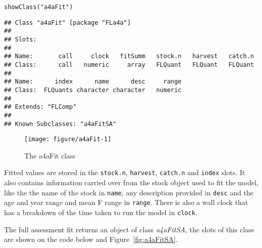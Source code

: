 \documentclass[a4paper,english,10pt]{article}\usepackage[]{graphicx}\usepackage[]{color}
\makeatletter
\def\maxwidth{ %
  \ifdim\Gin@nat@width>\linewidth
    \linewidth
  \else
    \Gin@nat@width
  \fi
}
\newcommand{\hlstr}[1]{\textcolor[rgb]{0.2,0.2,0.2}{#1}}%
\newcommand{\hlstd}[1]{\textcolor[rgb]{0,0,0}{#1}}%
\newcommand{\hlkwd}[1]{\textcolor[rgb]{0.361,0.506,0.596}{#1}}%
\newenvironment{kframe}{%
 \def\at@end@of@kframe{}%
 \ifinner\ifhmode%
  \def\at@end@of@kframe{\end{minipage}}%
  \begin{minipage}{\columnwidth}%
 \fi\fi%
 \def\FrameCommand##1{\hskip\@totalleftmargin \hskip-\fboxsep
 \colorbox{shadecolor}{##1}\hskip-\fboxsep
     \hskip-\linewidth \hskip-\@totalleftmargin \hskip\columnwidth}%
 \MakeFramed {\advance\hsize-\width
   \@totalleftmargin\z@ \linewidth\hsize
   \@setminipage}}%
 {\par\unskip\endMakeFramed%
 \at@end@of@kframe}
\newenvironment{knitrout}{}{} %
\newcommand{\code}[1]{{\texttt{#1}}}
\newcommand{\class}[1]{{\textit{#1}}}
\makeatother
\begin{document}
\begin{knitrout}
\color{fgcolor}\begin{kframe}
\begin{alltt}
\hlkwd{showClass}\hlstd{(}\hlstr{"a4aFit"}\hlstd{)}
\end{alltt}
\begin{verbatim}
## Class "a4aFit" [package "FLa4a"]
## 
## Slots:
##                                                                   
## Name:       call     clock   fitSumm   stock.n   harvest   catch.n
## Class:      call   numeric     array   FLQuant   FLQuant   FLQuant
##                                               
## Name:      index      name      desc     range
## Class:  FLQuants character character   numeric
## 
## Extends: "FLComp"
## 
## Known Subclasses: "a4aFitSA"
\end{verbatim}
\end{kframe}
\end{knitrout}

\begin{knitrout}
\color{fgcolor}\begin{figure}[H]

{\centering \texttt{[image: figure/a4aFit-1]} 

}

\caption[The a4aFit class]{The a4aFit class}\label{fig:a4aFit}
\end{figure}


\end{knitrout}

Fitted values are stored in the \code{stock.n}, \code{harvest}, \code{catch.n} and \code{index} slots. It also contains information carried over from the stock object used to fit the model, like the the name of the stock in \code{name}, any description provided in \code{desc} and the age and year range and mean F range in \code{range}. There is also a wall clock that has a breakdown of the time taken to run the model in \code{clock}.

The full assessment fit returns an object of class \class{a4aFitSA}, the slots of this class are shown on the code below and Figure~\ref{fig:a4aFitSA}.
\end{document}
